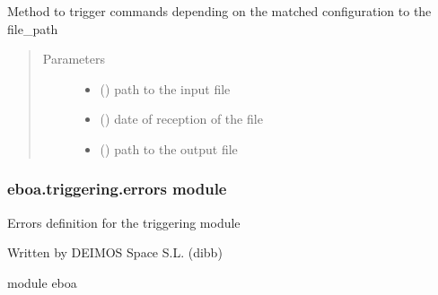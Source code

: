 
\begin{fulllineitems}
\label{\detokenize{eboa.triggering:eboa.triggering.eboa_triggering.triggering}}
Method to trigger commands depending on the matched configuration to the file\_path
\begin{quote}\begin{description}
\item[{Parameters}] \leavevmode\begin{itemize}
\item {} 
 () \textendash{} path to the input file

\item {} 
 () \textendash{} date of reception of the file

\item {} 
 () \textendash{} path to the output file

\end{itemize}

\end{description}\end{quote}

\end{fulllineitems}



\subsubsection{eboa.triggering.errors module}
\label{\detokenize{eboa.triggering:module-eboa.triggering.errors}}\label{\detokenize{eboa.triggering:eboa-triggering-errors-module}}
Errors definition for the triggering module

Written by DEIMOS Space S.L. (dibb)

module eboa

